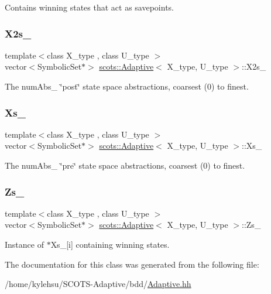 Contains winning states that act as savepoints. \mbox{\label{classscots_1_1Adaptive_a532d1acf3db0235c7bbd551b41a040fc}} 
\subsubsection{\texorpdfstring{X2s\+\_\+}{X2s\_}}
{\footnotesize\ttfamily template$<$class X\+\_\+type , class U\+\_\+type $>$ \\
vector$<$Symbolic\+Set$\ast$$>$ \hyperlink{classscots_1_1Adaptive}{scots\+::\+Adaptive}$<$ X\+\_\+type, U\+\_\+type $>$\+::X2s\+\_\+}

The num\+Abs\+\_\+ \char`\"{}post\char`\"{} state space abstractions, coarsest (0) to finest. \mbox{\label{classscots_1_1Adaptive_ae43471177bc6b7d3229a9497b46ee343}} 
\subsubsection{\texorpdfstring{Xs\+\_\+}{Xs\_}}
{\footnotesize\ttfamily template$<$class X\+\_\+type , class U\+\_\+type $>$ \\
vector$<$Symbolic\+Set$\ast$$>$ \hyperlink{classscots_1_1Adaptive}{scots\+::\+Adaptive}$<$ X\+\_\+type, U\+\_\+type $>$\+::Xs\+\_\+}

The num\+Abs\+\_\+ \char`\"{}pre\char`\"{} state space abstractions, coarsest (0) to finest. \mbox{\label{classscots_1_1Adaptive_a387e00a300c8c75d3a4eb6181dfab9c4}} 
\subsubsection{\texorpdfstring{Zs\+\_\+}{Zs\_}}
{\footnotesize\ttfamily template$<$class X\+\_\+type , class U\+\_\+type $>$ \\
vector$<$Symbolic\+Set$\ast$$>$ \hyperlink{classscots_1_1Adaptive}{scots\+::\+Adaptive}$<$ X\+\_\+type, U\+\_\+type $>$\+::Zs\+\_\+}

Instance of $\ast$\+Xs\+\_\+\mbox{[}i\mbox{]} containing winning states. 

The documentation for this class was generated from the following file\+:\begin{DoxyCompactItemize}
\item 
/home/kylehsu/\+S\+C\+O\+T\+S-\/\+Adaptive/bdd/\hyperlink{Adaptive_8hh}{Adaptive.\+hh}\end{DoxyCompactItemize}
